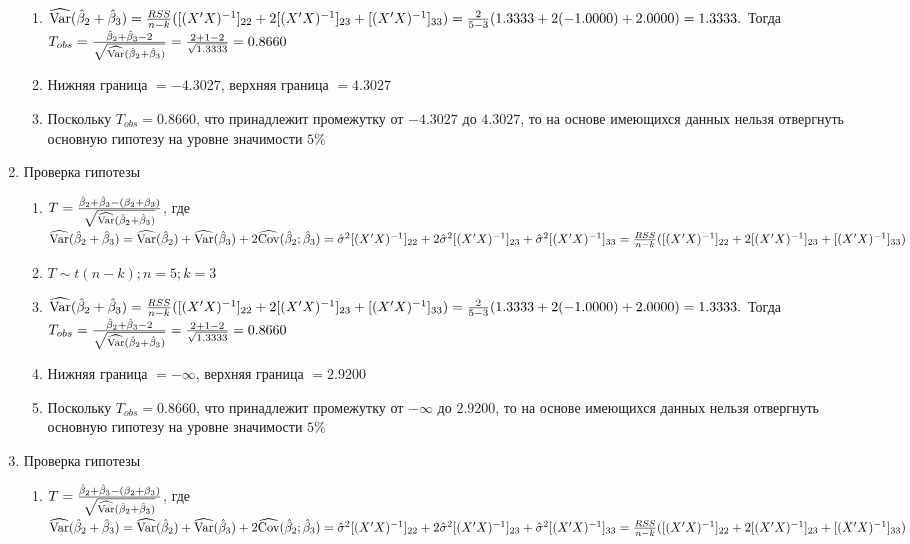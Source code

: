 \documentclass[pdftex,11pt,openany]{book}\usepackage[]{graphicx}\usepackage[]{color}
\begin{document}
\begin{solution}
\begin{enumerate}
\begin{enumerate}
\item $\widehat{\operatorname{Var}}(\hat{\beta}_2 + \hat{\beta}_3) = \frac{RSS}{n - k}([(X'X)^{-1}]_{22} + 2[(X'X)^{-1}]_{23} + [(X'X)^{-1}]_{33}) = \frac{2}{5 - 3} (1.3333 + 2(-1.0000) + 2.0000) = 1.3333.$ Тогда $T_{obs} = \frac{\hat{\beta}_2 + \hat{\beta}_3 - 2}{\sqrt{\widehat{\operatorname{Var}}(\hat{\beta}_2 + \hat{\beta}_3)}} = \frac{2 + 1 - 2}{\sqrt{1.3333}} = 0.8660$
\item Нижняя граница $= - 4.3027$, верхняя граница $= 4.3027$
\item Поскольку $T_{obs} = 0.8660$, что принадлежит промежутку от $- 4.3027$ до $4.3027$, то на основе имеющихся данных нельзя отвергнуть основную гипотезу на уровне значимости $5\%$
\end{enumerate}
\item Проверка гипотезы
\begin{enumerate}
\item $T = \frac{\hat{\beta}_2 + \hat{\beta}_3 - (\beta_2 + \beta_3)}{\sqrt{\widehat{\operatorname{Var}}(\hat{\beta}_2 + \hat{\beta}_3)}}$, где $\widehat{\operatorname{Var}}(\hat{\beta}_2 + \hat{\beta}_3) = \widehat{\operatorname{Var}}(\hat{\beta}_2) + \widehat{\operatorname{Var}}(\hat{\beta}_3) + 2\widehat{\operatorname{Cov}}(\hat{\beta}_2;\hat{\beta}_3) = \hat{\sigma}^2 [(X'X)^{-1}]_{22} + 2\hat{\sigma}^2 [(X'X)^{-1}]_{23} + \hat{\sigma}^2 [(X'X)^{-1}]_{33}= \frac{RSS}{n - k}([(X'X)^{-1}]_{22} + 2[(X'X)^{-1}]_{23} + [(X'X)^{-1}]_{33})$
\item $T \sim t(n-k); n = 5; k = 3$
\item $\widehat{\operatorname{Var}}(\hat{\beta}_2 + \hat{\beta}_3) = \frac{RSS}{n - k}([(X'X)^{-1}]_{22} + 2[(X'X)^{-1}]_{23} + [(X'X)^{-1}]_{33}) = \frac{2}{5 - 3} (1.3333 + 2(-1.0000) + 2.0000) = 1.3333.$ Тогда $T_{obs} = \frac{\hat{\beta}_2 + \hat{\beta}_3 - 2}{\sqrt{\widehat{\operatorname{Var}}(\hat{\beta}_2 + \hat{\beta}_3)}} = \frac{2 + 1 - 2}{\sqrt{1.3333}} = 0.8660$
\item Нижняя граница $= - \infty$, верхняя граница $= 2.9200$
\item Поскольку $T_{obs} = 0.8660$, что принадлежит промежутку от $- \infty$ до $2.9200$, то на основе имеющихся данных нельзя отвергнуть основную гипотезу на уровне значимости $5\%$
\end{enumerate}
\item Проверка гипотезы
\begin{enumerate}
\item $T = \frac{\hat{\beta}_2 + \hat{\beta}_3 - (\beta_2 + \beta_3)}{\sqrt{\widehat{\operatorname{Var}}(\hat{\beta}_2 + \hat{\beta}_3)}}$, где $\widehat{\operatorname{Var}}(\hat{\beta}_2 + \hat{\beta}_3) = \widehat{\operatorname{Var}}(\hat{\beta}_2) + \widehat{\operatorname{Var}}(\hat{\beta}_3) + 2\widehat{\operatorname{Cov}}(\hat{\beta}_2;\hat{\beta}_3) = \hat{\sigma}^2 [(X'X)^{-1}]_{22} + 2\hat{\sigma}^2 [(X'X)^{-1}]_{23} + \hat{\sigma}^2 [(X'X)^{-1}]_{33}= \frac{RSS}{n - k}([(X'X)^{-1}]_{22} + 2[(X'X)^{-1}]_{23} + [(X'X)^{-1}]_{33})$

\end{enumerate}
\end{enumerate}
\end{solution}
\end{document}
